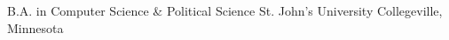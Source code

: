

\begin{cventries}

  \cventry
    {B.A. in Computer Science \& Political Science} %
    {St. John's University} %
    {Collegeville, Minnesota} %
    {} %
    {
    }

\end{cventries}
